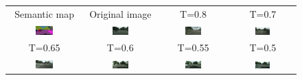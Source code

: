 \begin{figure} \label{fig:5.4}
    \tiny
    \centering
    \setlength\tabcolsep{-2pt}
    \begin{tabular}{cccc}
        Semantic map & Original image & T=0.8 & T=0.7 \\
        \includegraphics[width=0.25\textwidth]{Chapters/figures/experiments/seg_stop/0_1.0_seg_mask.png} &  \includegraphics[width=0.25\textwidth]{Chapters/figures/experiments/seg_stop/0_1.0_original.png} & \includegraphics[width=0.25\textwidth]{Chapters/figures/experiments/seg_stop/0_0.8_cond_sample.png} & \includegraphics[width=0.25\textwidth]{Chapters/figures/experiments/seg_stop/0_0.7_cond_sample.png} \\
        T=0.65 & T=0.6 & T=0.55 & T=0.5\\
        \includegraphics[width=0.25\textwidth]{Chapters/figures/experiments/seg_stop/0_0.6499999999999999_cond_sample.png} & \includegraphics[width=0.25\textwidth]{Chapters/figures/experiments/seg_stop/0_0.6_cond_sample.png} & \includegraphics[width=0.25\textwidth]{Chapters/figures/experiments/seg_stop/0_0.55_cond_sample.png} & \includegraphics[width=0.25\textwidth]{Chapters/figures/experiments/seg_stop/0_0.5_cond_sample.png}\\

\end{tabular}
\end{figure}
